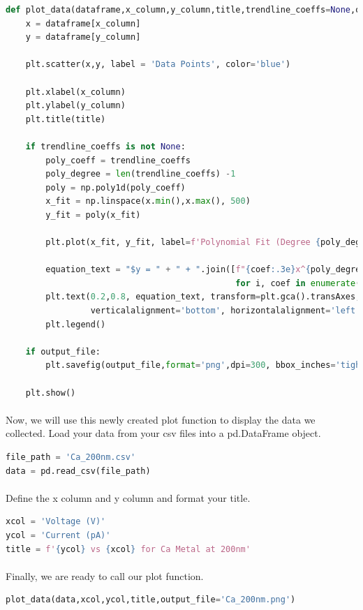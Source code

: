 \documentclass{journal}
\begin{document}
\begin{lstlisting}[language=python]
def plot_data(dataframe,x_column,y_column,title,trendline_coeffs=None,output_file=None):
    x = dataframe[x_column]
    y = dataframe[y_column]

    plt.scatter(x,y, label = 'Data Points', color='blue')

    plt.xlabel(x_column)
    plt.ylabel(y_column)
    plt.title(title)

    if trendline_coeffs is not None:
        poly_coeff = trendline_coeffs
        poly_degree = len(trendline_coeffs) -1
        poly = np.poly1d(poly_coeff)
        x_fit = np.linspace(x.min(),x.max(), 500)
        y_fit = poly(x_fit)
    
        plt.plot(x_fit, y_fit, label=f'Polynomial Fit (Degree {poly_degree})',color='red')
        
        equation_text = "$y = " + " + ".join([f"{coef:.3e}x^{poly_degree - i}" if i != poly_degree else f"{round(coef, 3)}"
                                              for i, coef in enumerate(poly_coeff)]) + "$"
        plt.text(0.2,0.8, equation_text, transform=plt.gca().transAxes, fontsize=8,
                 verticalalignment='bottom', horizontalalignment='left')
        plt.legend()

    if output_file:
        plt.savefig(output_file,format='png',dpi=300, bbox_inches='tight')
        
    plt.show()
\end{lstlisting}

\paragraph{}
Now, we will use this newly created plot function to display the data we collected. Load your data from your csv files into a pd.DataFrame object. 

\begin{lstlisting}[language=python]
file_path = 'Ca_200nm.csv'
data = pd.read_csv(file_path)
\end{lstlisting}
\paragraph{}
Define the x column and y column and format your title. 
\begin{lstlisting}[language=python]
xcol = 'Voltage (V)'
ycol = 'Current (pA)'
title = f'{ycol} vs {xcol} for Ca Metal at 200nm'
\end{lstlisting}
\paragraph{}
Finally, we are ready to call our plot function.
\begin{lstlisting}[language=python]
plot_data(data,xcol,ycol,title,output_file='Ca_200nm.png')
\end{lstlisting}
\end{document}

